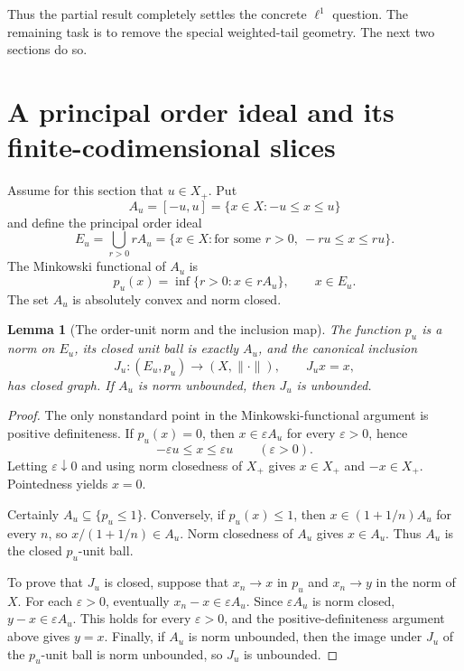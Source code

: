 \documentclass[11pt]{article}
\newtheorem{lemma}[theorem]{Lemma}
\theoremstyle{remark}
\newcommand{\norm}[1]{\lVert #1\rVert}
\begin{document}
Thus the partial result completely settles the concrete $\ell^1$ question.
The remaining task is to remove the special weighted-tail geometry.  The
next two sections do so.

\section{A principal order ideal and its finite-codimensional slices}

Assume for this section that $u\in X_+$.  Put
\[
 A_u=[-u,u]
 =\{x\in X:-u\leq x\leq u\}
\]
and define the principal order ideal
\[
 E_u=\bigcup_{r>0}rA_u
 =\{x\in X:\text{for some }r>0,\ -ru\leq x\leq ru\}.
\]
The Minkowski functional of $A_u$ is
\[
 p_u(x)=\inf\{r>0:x\in rA_u\},\qquad x\in E_u.
\]
The set $A_u$ is absolutely convex and norm closed.

\begin{lemma}[The order-unit norm and the inclusion map]\label{lem:closed-inclusion}
The function $p_u$ is a norm on $E_u$, its closed unit ball is exactly
$A_u$, and the canonical inclusion
\[
 J_u:(E_u,p_u)\longrightarrow (X,\norm{\cdot}),\qquad J_u x=x,
\]
has closed graph.  If $A_u$ is norm unbounded, then $J_u$ is unbounded.
\end{lemma}

\begin{proof}
The only nonstandard point in the Minkowski-functional argument is
positive definiteness.  If $p_u(x)=0$, then $x\in\varepsilon A_u$ for every
$\varepsilon>0$, hence
\[
 -\varepsilon u\leq x\leq\varepsilon u\qquad(\varepsilon>0).
\]
Letting $\varepsilon\downarrow0$ and using norm closedness of $X_+$ gives
$x\in X_+$ and $-x\in X_+$.  Pointedness yields $x=0$.

Certainly $A_u\subseteq\{p_u\leq1\}$.  Conversely, if $p_u(x)\leq1$, then
$x\in(1+1/n)A_u$ for every $n$, so $x/(1+1/n)\in A_u$.  Norm closedness of
$A_u$ gives $x\in A_u$.  Thus $A_u$ is the closed $p_u$-unit ball.

To prove that $J_u$ is closed, suppose that $x_n\to x$ in $p_u$ and
$x_n\to y$ in the norm of $X$.  For each $\varepsilon>0$, eventually
$x_n-x\in\varepsilon A_u$.  Since $\varepsilon A_u$ is norm closed,
$y-x\in\varepsilon A_u$.  This holds for every $\varepsilon>0$, and the
positive-definiteness argument above gives $y=x$.  Finally, if $A_u$ is
norm unbounded, then the image under $J_u$ of the $p_u$-unit ball is norm
unbounded, so $J_u$ is unbounded.
\end{proof}
\end{document}
